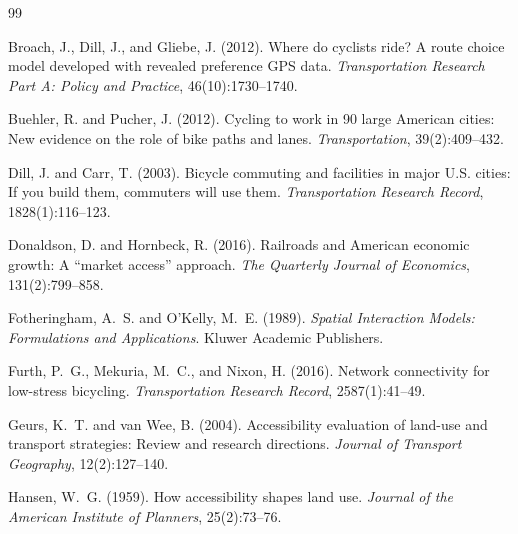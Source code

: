 \documentclass[12pt,a4paper]{article}
\begin{document}


\begin{thebibliography}{99}

Broach, J., Dill, J., and Gliebe, J. (2012).
\newblock Where do cyclists ride? {A} route choice model developed with revealed preference {GPS} data.
\newblock \textit{Transportation Research Part A: Policy and Practice}, 46(10):1730--1740.

Buehler, R. and Pucher, J. (2012).
\newblock Cycling to work in 90 large {A}merican cities: New evidence on the role of bike paths and lanes.
\newblock \textit{Transportation}, 39(2):409--432.

Dill, J. and Carr, T. (2003).
\newblock Bicycle commuting and facilities in major {U.S.} cities: If you build them, commuters will use them.
\newblock \textit{Transportation Research Record}, 1828(1):116--123.

Donaldson, D. and Hornbeck, R. (2016).
\newblock Railroads and {A}merican economic growth: A ``market access'' approach.
\newblock \textit{The Quarterly Journal of Economics}, 131(2):799--858.

Fotheringham, A.~S. and O'Kelly, M.~E. (1989).
\newblock \textit{Spatial Interaction Models: Formulations and Applications}.
\newblock Kluwer Academic Publishers.

Furth, P.~G., Mekuria, M.~C., and Nixon, H. (2016).
\newblock Network connectivity for low-stress bicycling.
\newblock \textit{Transportation Research Record}, 2587(1):41--49.

Geurs, K.~T. and van Wee, B. (2004).
\newblock Accessibility evaluation of land-use and transport strategies: Review and research directions.
\newblock \textit{Journal of Transport Geography}, 12(2):127--140.

Hansen, W.~G. (1959).
\newblock How accessibility shapes land use.
\newblock \textit{Journal of the American Institute of Planners}, 25(2):73--76.


\end{thebibliography}
\end{document}
